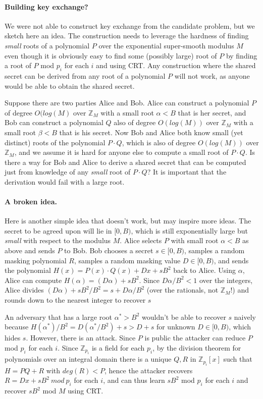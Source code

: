 \documentclass[letterpaper,twocolumn,10pt]{article}
\begin{document}
\paragraph{Building key exchange?} We were not able to construct key exchange from the candidate problem, but we sketch here an idea. The construction needs to leverage the hardness of finding \emph{small} roots of a polynomial $P$ over the exponential super-smooth modulus $M$ even though it is obviously easy to find some (possibly large) root of $P$ by finding a root of $P$ mod $p_i$ for each $i$ and using CRT. Any construction where the shared secret can be derived from any root of a polynomial $P$ will not work, as anyone would be able to obtain the shared secret. 

Suppose there are two parties Alice and Bob. Alice can construct a polynomial $P$ of degree $O(log(M)$ over $\mathbb{Z}_M$ with a small root $\alpha < B$ that is her secret, and Bob can construct a polynomial $Q$ also of degree $O(log(M))$ over $\mathbb{Z}_M$ with a small root $\beta < B$ that is his secret. Now Bob and Alice both know small (yet distinct) roots of the polynomial $P \cdot Q$, which is also of degree $O(log(M))$ over $\mathbb{Z}_M$, and we assume it is hard for anyone else to compute a small root of $P\cdot Q$. Is there a way for Bob and Alice to derive a shared secret that can be computed just from knowledge of any \emph{small} root of $P\cdot Q$? It is important that the derivation would fail with a large root. 

\paragraph{A broken idea.} Here is another simple idea that doesn't work, but may inspire more ideas. The secret to be agreed upon will lie in $[0, B)$, which is still exponentially large but \emph{small} with respect to the modulus $M$. Alice selects $P$ with small root $\alpha < B$ as above and sends $P$ to Bob. Bob chooses a secret $s \in [0, B)$, samples a random masking polynomial $R$, samples a random masking value $D \in [0, B)$, and sends the polynomial $H(x) = P(x) \cdot Q(x) + D x + sB^2$ back to Alice. Using $\alpha$, Alice can compute $H(\alpha) = (D \alpha) + sB^2$. Since $D\alpha/B^2 < 1$ over the integers, Alice divides $(D \alpha) + sB^2 / B^2 = s + D\alpha/B^2$ (over the rationals, not $\mathbb{Z}_M$!) and rounds down to the nearest integer to recover $s$

An adversary that has a large root $\alpha^* > B^2$ wouldn't be able to recover $s$ naively because $H(\alpha^*)/B^2 = D (\alpha^*/ B^2) + s > D + s$ for unknown $D \in [0, B)$, which hides $s$. However, there is an attack. Since $P$ is public the attacker can reduce $P$ mod $p_i$ for each $i$. Since $\mathbb{Z}_{p_i}$ is a field for each $p_i$, by the division theorem for polynomials over an integral domain there is a unique $Q, R$ in $\mathbb{Z}_{p_i}[x]$ such that $H = P Q + R$ with $deg(R) < P$, hence the attacker recovers $R = D x + sB^2 \ mod \ p_i$ for each $i$, and can thus learn $s B^2$ mod $p_i$ for each $i$ and recover $sB^2$ mod $M$ using CRT. 
 
\end{document}
